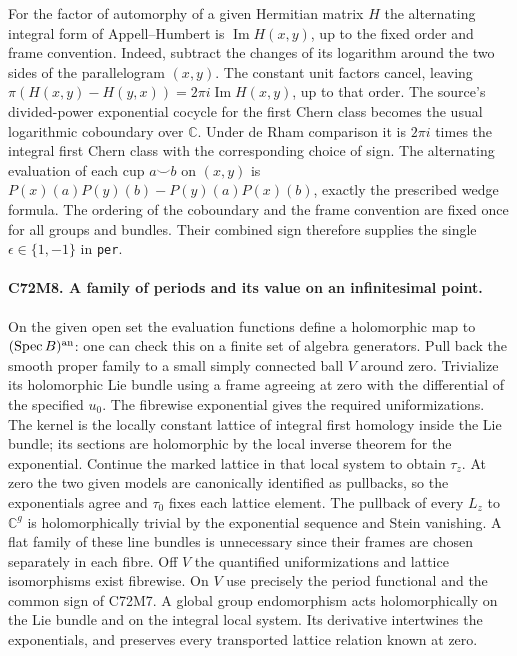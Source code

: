 For the factor of automorphy of a given Hermitian matrix $H$ the
alternating integral form of Appell--Humbert is
$\operatorname{Im} H(x,y)$, up to the fixed order and frame convention.
Indeed, subtract the changes of its logarithm around the two sides of
the parallelogram $(x,y)$. The constant unit factors cancel, leaving
$\pi(H(x,y)-H(y,x))=2\pi i\operatorname{Im}H(x,y)$, up to that
order. The source's divided-power exponential cocycle for the first
Chern class becomes the usual logarithmic coboundary over $\mathbb C$.
Under de Rham comparison it is $2\pi i$ times the integral first
Chern class with the corresponding choice of sign. The alternating
evaluation of each cup $a\smile b$ on $(x,y)$ is
$P(x)(a)P(y)(b)-P(y)(a)P(x)(b)$, exactly the prescribed wedge
formula. The ordering of the coboundary and the frame convention
are fixed once for all groups and bundles. Their combined sign
therefore supplies the single $\epsilon\in\{1,-1\}$ in \texttt{per}.

\paragraph{C72M8. A family of periods and its value on an infinitesimal point.}
On the given open set the evaluation functions define a holomorphic map
to $(\operatorname{Spec} B)^{\rm an}$: one can check this on a finite
set of algebra generators. Pull back the smooth proper family to a
small simply connected ball $V$ around zero. Trivialize its holomorphic
Lie bundle using a frame agreeing at zero with the differential of
the specified $u_0$. The fibrewise exponential gives the required
uniformizations. The kernel is the locally constant lattice of
integral first homology inside the Lie bundle; its sections are
holomorphic by the local inverse theorem for the exponential. Continue
the marked lattice in that local system to obtain $\tau_z$. At zero
the two given models are canonically identified as pullbacks, so the
exponentials agree and $\tau_0$ fixes each lattice element. The
pullback of every $L_z$ to $\mathbb C^g$ is holomorphically trivial
by the exponential sequence and Stein vanishing. A flat family of
these line bundles is unnecessary since their frames are chosen
separately in each fibre. Off $V$ the quantified uniformizations and
lattice isomorphisms exist fibrewise. On $V$ use precisely the
period functional and the common sign of C72M7. A global group
endomorphism acts holomorphically on the Lie bundle and on the
integral local system. Its derivative intertwines the exponentials,
and preserves every transported lattice relation known at zero.

